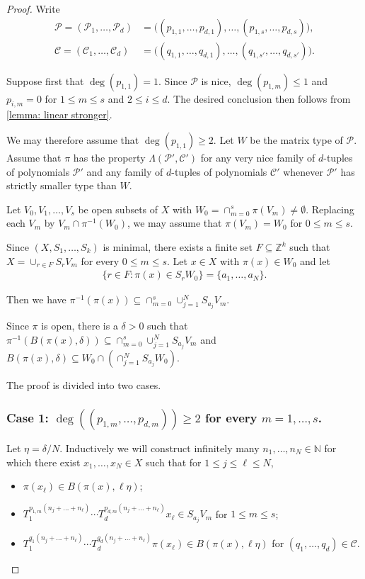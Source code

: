 \documentclass[11pt,reqno]{amsart}
\newcommand{\Z}{\mathbb{Z}}
\newcommand{\N}{\mathbb{N}}
\newcommand{\cC}{{\mathcal C}}
\newcommand{\cP}{{\mathcal P}}
\theoremstyle{definition}
\theoremstyle{remark}
\begin{document}
\begin{proof}
    Write\begin{align*}
        \cP=(\cP_1,\dots,\cP_d) &= \big((p_{1,1},\dots,p_{d,1}),\dots,(p_{1,s},\dots,p_{d,s})\big),\\
        \cC=(\cC_1,\dots,\cC_d) &= \big((q_{1,1},\dots,q_{d,1}),\dots,(q_{1,s'},\dots,q_{d,s'})\big).
    \end{align*}
    
    Suppose first that $\deg(p_{1,1})=1$. Since $\cP$ is nice, $\deg(p_{1,m})\leq 1$ and $p_{i,m}=0$ for $1\leq m \leq s$ and $2\leq i \leq d$. The desired conclusion then follows from \cref{lemma: linear stronger}.

    We may therefore assume that $\deg(p_{1,1})\geq 2$. Let $W$ be the matrix type of $\cP$. Assume that $\pi$ has the property $\Lambda(\cP',\cC')$ for any very nice family of $d$-tuples of polynomials $\cP'$ and any family of $d$-tuples of polynomials $\cC'$ whenever $\cP'$ has strictly smaller type than $W$.

    Let $V_{0},V_{1},\dots,V_{s}$ be open subsets of $X$ with $W_0= \cap_{m=0}^{s} \pi(V_{m})\neq \emptyset$. Replacing each $V_{m}$ by $V_{m}\cap \pi^{-1}(W_0)$, we may assume that $\pi(V_m)=W_0$ for $0\leq m \leq s$.

    Since $(X,S_{1},\dots,S_k)$ is minimal, there exists a finite set $F\subseteq \Z^{k}$ such that $X=\cup_{r\in F}S_{r} V_{m}$ for every $0\leq m\leq s$. Let $x\in X$ with $\pi(x)\in W_0$ and let \begin{align*}
        \{r\in F: \pi(x)\in S_{r}W_0\} = \{a_{1},\dots,a_{N}\}.
    \end{align*}
    
    Then we have $\pi^{-1}(\pi(x)) \subseteq \cap_{m=0}^{s}\cup_{j=1}^{N}S_{a_{j}}V_{m}$.
    
    Since $\pi$ is open, there is a $\delta>0$ such that $\pi^{-1}(B(\pi(x),\delta)) \subseteq \cap_{m=0}^{s}\cup_{j=1}^{N}S_{a_{j}}V_{m}$ and $B(\pi(x),\delta)\subseteq W_0\cap \left(\cap_{j=1}^{N} S_{a_{j}}W_0\right)$.

    The proof is divided into two cases.


\subsubsection*{Case 1: $\deg((p_{1,m},\dots,p_{d,m}))\geq 2$ for every $m=1,\dots,s$.}

Let $\eta=\delta/N$. Inductively we will construct infinitely many $n_1,\dots,n_{N}\in \N$ for which there exist $x_{1},\dots,x_{N}\in X$ such that for $1\leq j \leq \ell\leq N$,\begin{itemize}
    \item $\pi(x_{\ell})\in B(\pi(x),\ell\eta)$;
    \item $T_1^{p_{1,m}(n_j+\dots+n_\ell)}\cdots T_d^{p_{d,m}(n_j+\dots+n_\ell)} x_{\ell}\in S_{a_{j}}V_{m}$ for $1\leq m\leq s$;
    \item $ T_1^{q_1(n_{j}+\dots+n_{\ell})}\cdots T_d^{q_d(n_{j}+\dots+n_{\ell})} \pi(x_{\ell})\in B(\pi(x),\ell\eta)$ for $(q_1,\dots,q_d)\in \cC$.
\end{itemize}


\end{proof}
\end{document}
